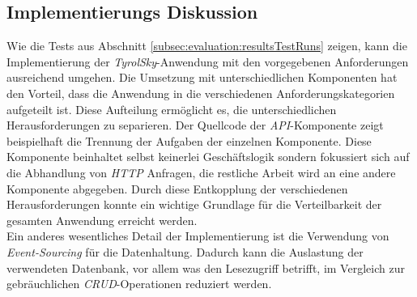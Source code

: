 \subsection{Implementierungs Diskussion}
% 
% 
Wie die Tests aus Abschnitt \ref{subsec:evaluation:resultsTestRuns} zeigen, kann die Implementierung der \textit{TyrolSky}-Anwendung mit den vorgegebenen Anforderungen ausreichend umgehen. Die Umsetzung mit unterschiedlichen Komponenten hat den Vorteil, dass die Anwendung  in die verschiedenen Anforderungskategorien aufgeteilt ist. Diese Aufteilung ermöglicht es, die unterschiedlichen Herausforderungen zu separieren. Der Quellcode der \textit{API}-Komponente zeigt beispielhaft die Trennung der Aufgaben der einzelnen Komponente. Diese Komponente beinhaltet selbst keinerlei Geschäftslogik sondern fokussiert sich auf die Abhandlung von \textit{HTTP} Anfragen, die restliche Arbeit wird an eine andere Komponente abgegeben. Durch diese Entkopplung der verschiedenen Herausforderungen konnte ein wichtige Grundlage für die Verteilbarkeit der gesamten Anwendung erreicht werden. \\
% 
% 
Ein anderes wesentliches Detail der Implementierung ist die Verwendung von \textit{Event-Sourcing} für die Datenhaltung. Dadurch kann die Auslastung der verwendeten Datenbank, vor allem was den Lesezugriff betrifft, im Vergleich zur gebräuchlichen \textit{CRUD}-Operationen reduziert werden. 
